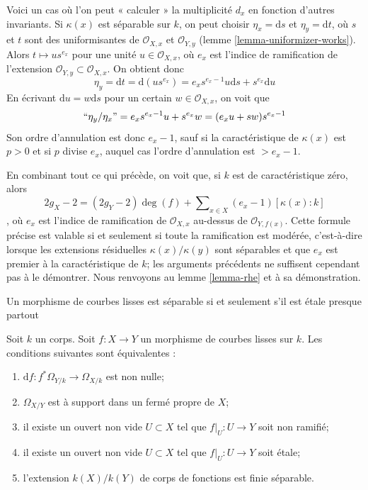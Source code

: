 \medskip\noindent
Voici un cas où l'on peut « calculer » la multiplicité $d_x$ en fonction d'autres invariants. Si $\kappa(x)$ est séparable sur $k$, on peut choisir $\eta_x = \text{d}s$ et $\eta_y = \text{d}t$, où $s$ et $t$ sont des uniformisantes de $\mathcal{O}_{X, x}$ et $\mathcal{O}_{Y, y}$ (lemme \ref{lemma-uniformizer-works}). Alors $t \mapsto u s^{e_x}$ pour une unité $u \in \mathcal{O}_{X, x}$, où $e_x$ est l'indice de ramification de l'extension $\mathcal{O}_{Y, y} \subset \mathcal{O}_{X, x}$. On obtient donc $$
\eta_y = \text{d}t = \text{d}(u s^{e_x}) =
e_x s^{e_x - 1} u \text{d}s + s^{e_x} \text{d}u
$$ En écrivant $\text{d}u = w \text{d}s$ pour un certain $w \in \mathcal{O}_{X, x}$, on voit que $$
``\eta_y/\eta_x" = e_x s^{e_x - 1} u + s^{e_x} w = (e_x u + s w)s^{e_x - 1}
$$ Son ordre d'annulation est donc $e_x - 1$, sauf si la caractéristique de $\kappa(x)$ est $p > 0$ et si $p$ divise $e_x$, auquel cas l'ordre d'annulation est $> e_x - 1$.

\medskip\noindent
En combinant tout ce qui précède, on voit que, si $k$ est de caractéristique zéro, alors $$
2g_X - 2 = (2g_Y - 2)\deg(f) +
\sum\nolimits_{x \in X} (e_x - 1)[\kappa(x) : k]
$$, où $e_x$ est l'indice de ramification de $\mathcal{O}_{X, x}$ au-dessus de $\mathcal{O}_{Y, f(x)}$. Cette formule précise est valable si et seulement si toute la ramification est modérée, c'est-à-dire lorsque les extensions résiduelles $\kappa(x)/\kappa(y)$ sont séparables et que $e_x$ est premier à la caractéristique de $k$; les arguments précédents ne suffisent cependant pas à le démontrer. Nous renvoyons au lemme \ref{lemma-rhe} et à sa démonstration.

\begin{lemma}
\label{lemma-generically-etale}
\begin{slogan}
Un morphisme de courbes lisses est séparable si et seulement s'il est étale presque partout
\end{slogan}
Soit $k$ un corps. Soit $f : X \to Y$ un morphisme de courbes lisses sur $k$. Les conditions suivantes sont équivalentes : \begin{enumerate} \item $\text{d}f : f^*\Omega_{Y/k} \to \Omega_{X/k}$ est non nulle; \item $\Omega_{X/Y}$ est à support dans un fermé propre de $X$; \item il existe un ouvert non vide $U \subset X$ tel que $f|_U : U \to Y$ soit non ramifié; \item il existe un ouvert non vide $U \subset X$ tel que $f|_U : U \to Y$ soit \'etale; \item l'extension $k(X)/k(Y)$ de corps de fonctions est finie séparable.
\end{enumerate}
\end{lemma}

